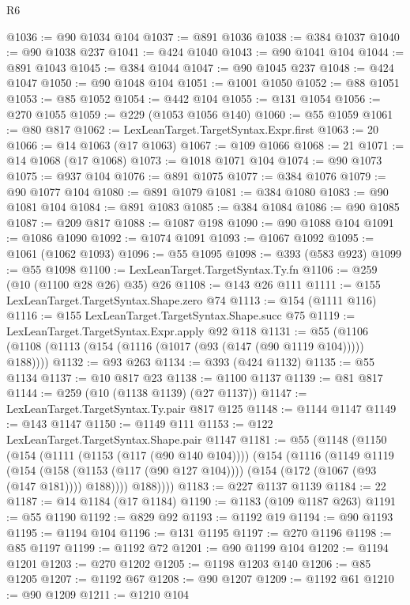 \begin{lexlean}{R6}
\begin{coremodule}
@1036 := @90 @1034 @104
@1037 := @891 @1036
@1038 := @384 @1037
@1040 := @90 @1038 @237
@1041 := @424 @1040
@1043 := @90 @1041 @104
@1044 := @891 @1043
@1045 := @384 @1044
@1047 := @90 @1045 @237
@1048 := @424 @1047
@1050 := @90 @1048 @104
@1051 := @1001 @1050
@1052 := @88 @1051
@1053 := @85 @1052
@1054 := @442 @104
@1055 := @131 @1054
@1056 := @270 @1055
@1059 := @229 (@1053 @1056 @140)
@1060 := @55 @1059
@1061 := @80 @817
@1062 := LexLeanTarget.TargetSyntax.Expr.first
@1063 := 20
@1066 := @14 @1063 (@17 @1063)
@1067 := @109 @1066
@1068 := 21
@1071 := @14 @1068 (@17 @1068)
@1073 := @1018 @1071 @104
@1074 := @90 @1073
@1075 := @937 @104
@1076 := @891 @1075
@1077 := @384 @1076
@1079 := @90 @1077 @104
@1080 := @891 @1079
@1081 := @384 @1080
@1083 := @90 @1081 @104
@1084 := @891 @1083
@1085 := @384 @1084
@1086 := @90 @1085
@1087 := @209 @817
@1088 := @1087 @198
@1090 := @90 @1088 @104
@1091 := @1086 @1090
@1092 := @1074 @1091
@1093 := @1067 @1092
@1095 := @1061 (@1062 @1093)
@1096 := @55 @1095
@1098 := @393 (@583 @923)
@1099 := @55 @1098
@1100 := LexLeanTarget.TargetSyntax.Ty.fn
@1106 := @259 (@10 (@1100 @28 @26) @35) @26
@1108 := @143 @26 @111
@1111 := @155 LexLeanTarget.TargetSyntax.Shape.zero @74
@1113 := @154 (@1111 @116)
@1116 := @155 LexLeanTarget.TargetSyntax.Shape.succ @75
@1119 := LexLeanTarget.TargetSyntax.Expr.apply @92 @118
@1131 := @55 (@1106 (@1108 (@1113 (@154 (@1116 (@1017 (@93 (@147 (@90 @1119 @104))))) @188))))
@1132 := @93 @263
@1134 := @393 (@424 @1132)
@1135 := @55 @1134
@1137 := @10 @817 @23
@1138 := @1100 @1137
@1139 := @81 @817
@1144 := @259 (@10 (@1138 @1139) (@27 @1137))
@1147 := LexLeanTarget.TargetSyntax.Ty.pair @817 @125
@1148 := @1144 @1147
@1149 := @143 @1147
@1150 := @1149 @111
@1153 := @122 LexLeanTarget.TargetSyntax.Shape.pair @1147
@1181 := @55
    (@1148
      (@1150
        (@154
          (@1111 (@1153 (@117 (@90 @140 @104))))
          (@154
            (@1116
              (@1149
                @1119
                (@154
                  (@158 (@1153 (@117 (@90 @127 @104))))
                  (@154 (@172 (@1067 (@93 (@147 @181)))) @188))))
            @188))))
@1183 := @227 @1137 @1139
@1184 := 22
@1187 := @14 @1184 (@17 @1184)
@1190 := @1183 (@109 @1187 @263)
@1191 := @55 @1190
@1192 := @829 @92
@1193 := @1192 @19
@1194 := @90 @1193
@1195 := @1194 @104
@1196 := @131 @1195
@1197 := @270 @1196
@1198 := @85 @1197
@1199 := @1192 @72
@1201 := @90 @1199 @104
@1202 := @1194 @1201
@1203 := @270 @1202
@1205 := @1198 @1203 @140
@1206 := @85 @1205
@1207 := @1192 @67
@1208 := @90 @1207
@1209 := @1192 @61
@1210 := @90 @1209
@1211 := @1210 @104

\end{coremodule}
\end{lexlean}
